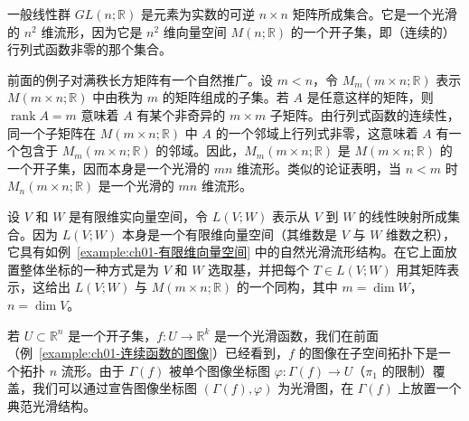 \documentclass[../../main.tex]{subfiles}
\begin{document}
\begin{example}[一般线性群]\label{example:ch01-一般线性群}
一般线性群 $GL(n;\mathbb{R})$ 是元素为实数的可逆 $n\times n$ 矩阵所成集合。它是一个光滑的 $n^{2}$ 维流形，因为它是 $n^{2}$ 维向量空间 $M(n;\mathbb{R})$ 的一个开子集，即（连续的）行列式函数非零的那个集合。
\end{example}

\begin{example}[满秩矩阵]\label{example:ch01-满秩矩阵}
前面的例子对满秩长方矩阵有一个自然推广。设 $m<n$，令 $M_{m}(m\times n;\mathbb{R})$ 表示 $M(m\times n;\mathbb{R})$ 中由秩为 $m$ 的矩阵组成的子集。若 $A$ 是任意这样的矩阵，则 $\operatorname{rank}A=m$ 意味着 $A$ 有某个非奇异的 $m\times m$ 子矩阵。由行列式函数的连续性，同一个子矩阵在 $M(m\times n;\mathbb{R})$ 中 $A$ 的一个邻域上行列式非零，这意味着 $A$ 有一个包含于 $M_{m}(m\times n;\mathbb{R})$ 的邻域。因此，$M_{m}(m\times n;\mathbb{R})$ 是 $M(m\times n;\mathbb{R})$ 的一个开子集，因而本身是一个光滑的 $mn$ 维流形。类似的论证表明，当 $n<m$ 时 $M_{n}(m\times n;\mathbb{R})$ 是一个光滑的 $mn$ 维流形。
\end{example}

\begin{example}[线性映射空间]\label{example:ch01-线性映射空间}
设 $V$ 和 $W$ 是有限维实向量空间，令 $L(V;W)$ 表示从 $V$ 到 $W$ 的线性映射所成集合。因为 $L(V;W)$ 本身是一个有限维向量空间（其维数是 $V$ 与 $W$ 维数之积），它具有如例~\cref{example:ch01-有限维向量空间} 中的自然光滑流形结构。在它上面放置整体坐标的一种方式是为 $V$ 和 $W$ 选取基，并把每个 $T\in L(V;W)$ 用其矩阵表示，这给出 $L(V;W)$ 与 $M(m\times n;\mathbb{R})$ 的一个同构，其中 $m=\dim W$，$n=\dim V$。
\end{example}

\begin{example}[光滑函数的图像]\label{example:ch01-光滑函数图像}
若 $U\subset\mathbb{R}^{n}$ 是一个开子集，$f:U\to\mathbb{R}^{k}$ 是一个光滑函数，我们在前面（例~\cref{example:ch01-连续函数的图像}）已经看到，$f$ 的图像在子空间拓扑下是一个拓扑 $n$ 流形。由于 $\Gamma(f)$ 被单个图像坐标图 $\varphi:\Gamma(f)\to U$（$\pi_{1}$ 的限制）覆盖，我们可以通过宣告图像坐标图 $(\Gamma(f),\varphi)$ 为光滑图，在 $\Gamma(f)$ 上放置一个典范光滑结构。
\end{example}
\end{document}
